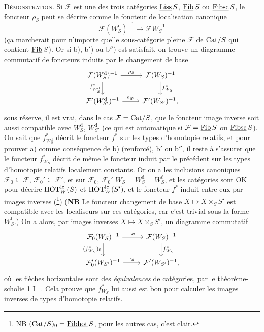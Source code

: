 \textsc{Démonstration.} Si $\mathcal{F}$ est une des trois catégories $\underline{\mathrm{Liss}}\,S$, $\underline{\mathrm{Fib}}\,S$ ou $\underline{\mathrm{Fibsc}}\,S$, le foncteur $\rho_S$ peut se décrire comme le foncteur de localisation canonique
\[
\mathcal{F}(W_S^{\mathrm{d}})^{-1} \longrightarrow \mathcal{F}W_S^{-1}
\]
(ça marcherait pour n'importe quelle sous-catégorie pleine $\mathcal{F}$ de $\mathrm{Cat}/S$ qui contient $\underline{\mathrm{Fib}}\,S$). Or si b), b$'$) ou b$''$) est satisfait, on trouve un diagramme commutatif de foncteurs induits par le changement de base
\[
\begin{tikzcd}
\mathcal{F}(W_S^{\mathrm{d}})^{-1} \arrow[r, "\rho_S"] \arrow[d, "f^*_{W_S^{\mathrm{d}}}"'] & \mathcal{F}(W_S)^{-1} \arrow[d, "f^*_{W_S}"] \\
\mathcal{F}'(W_{S'}^{\mathrm{d}})^{-1} \arrow[r, "\rho_{S'}"] & \mathcal{F}'(W_{S'})^{-1},
\end{tikzcd}
\]
sous réserve, il est vrai, dans le cas $\mathcal{F} = \mathrm{Cat}/S$, que le foncteur image inverse soit aussi compatible avec $W_S^{\mathrm{d}}$, $W_{S'}^{\mathrm{d}}$ (ce qui est automatique si $\mathcal{F} = \underline{\mathrm{Fib}}\,S$ ou $\underline{\mathrm{Fibsc}}\,S$). On sait que $f^*_{W_S^{\mathrm{d}}}$ décrit le foncteur $f^*$ sur les types d'homotopie relatifs, et pour prouver a) comme conséquence
de b) (renforcé), b$'$ ou b$''$, il reste à s'assurer que le foncteur $f^*_{W_S}$ décrit de même le foncteur induit par le précédent sur les types d'homotopie relatifs localement constants. Or on a les inclusions canoniques $\mathcal{F}_0 \subseteq \mathcal{F}$, $\mathcal{F}_0' \subseteq \mathcal{F}'$, et sur $\mathcal{F}_0$, $\mathcal{F}_0'$ $W_S = W_S^{\mathrm{d}} = W_S^{\mathrm{f}}$, et les catégories sont OK pour décrire $\mathrm{HOT}_W^{\mathrm{lc}}(S)$ et $\mathrm{HOT}_W^{\mathrm{lc}}(S')$, et le foncteur $f^*$ induit entre eux par images inverses (\footnote[65]{NB $(\mathrm{Cat}/S)_0 = \underline{\mathrm{Fibhot}}\,S$, pour les autres cas, c'est clair.}) (\textbf{NB} Le foncteur changement de base $X \longmapsto X \times_S S'$ est compatible avec les localiseurs sur ces catégories, car c'est trivial sous la forme $W_S^{\mathrm{f}}$.) On a alors, par images inverses $X \longmapsto X \times_S S'$, un diagramme commutatif
\[
\begin{tikzcd}
\mathcal{F}_0(W_S)^{-1} \arrow[r, "\approx"] \arrow[d, "(f^*_{W_S})_0"'] & \mathcal{F}(W_S)^{-1} \arrow[d, "f^*_{W_S}"] \\
\mathcal{F}_0'(W_{S'})^{-1} \arrow[r, "\approx"] & \mathcal{F}'(W_{S'})^{-1},
\end{tikzcd}
\]
où les flèches horizontales sont des \textit{équivalences} de catégories, par le théorème-scholie 1 \textcircled{I}~. Cela prouve que $f^*_{W_S}$ lui aussi est bon pour calculer les images inverses de types d'homotopie relatifs.

